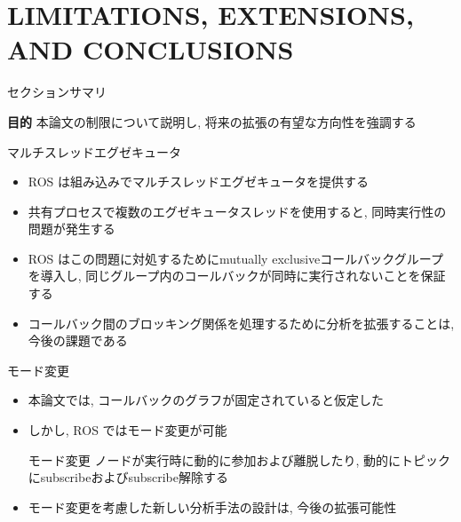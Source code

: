 
\section{LIMITATIONS, EXTENSIONS, AND CONCLUSIONS}
\label{sec: limitations, extensions, and conclusions}

\begin{frame}{セクションサマリ}
    \begin{itembox}[l]{\textbf{目的}}
        本論文の制限について説明し, 将来の拡張の有望な方向性を強調する
    \end{itembox}
\end{frame}

\begin{frame}{マルチスレッドエグゼキュータ}
    \begin{itemize}
        \item ROS は組み込みでマルチスレッドエグゼキュータを提供する
        \item 共有プロセスで複数のエグゼキュータスレッドを使用すると, 同時実行性の問題が発生する
        \item ROS はこの問題に対処するためにmutually exclusiveコールバックグループを導入し, 同じグループ内のコールバックが同時に実行されないことを保証する
        \item コールバック間のブロッキング関係を処理するために分析を拡張することは, 今後の課題である
    \end{itemize}
\end{frame}

\begin{frame}{モード変更}
    \begin{itemize}
        \item 本論文では, コールバックのグラフが固定されていると仮定した
        \item しかし, ROS ではモード変更が可能
              \begin{block}{モード変更}
                  ノードが実行時に動的に参加および離脱したり, 動的にトピックにsubscribeおよびsubscribe解除する
              \end{block}
              \vspace{5mm}
        \item モード変更を考慮した新しい分析手法の設計は, 今後の拡張可能性
    \end{itemize}
\end{frame}

